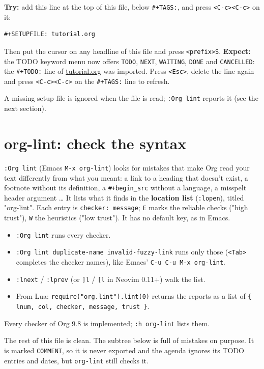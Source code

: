 \textbf{Try:} add this line at the top of this file, below \texttt{\#+TAGS:}, and press
\texttt{<C-c><C-c>} on it:
\begin{verbatim}
#+SETUPFILE: tutorial.org
\end{verbatim}
Then put the cursor on any headline of this file and press \texttt{<prefix>S}.
\textbf{Expect:} the TODO keyword menu now offers \texttt{TODO}, \texttt{NEXT}, \texttt{WAITING},
\texttt{DONE} and \texttt{CANCELLED}: the \texttt{\#+TODO:} line of \href{tutorial.org}{tutorial.org}
was imported. Press \texttt{<Esc>}, delete the line again and press
\texttt{<C-c><C-c>} on the \texttt{\#+TAGS:} line to refresh.

A missing setup file is ignored when the file is read; \texttt{:Org lint}
reports it (see the next section).
\section{org-lint: check the syntax}
\label{sec:orge7575d4}
\texttt{:Org lint} (Emacs \texttt{M-x org-lint}) looks for mistakes that make Org read
your text differently from what you meant: a link to a heading that
doesn't exist, a footnote without its definition, a \texttt{\#+begin\_src} without
a language, a misspelt header argument \ldots{} It lists what it finds in the
\textbf{location list} (\texttt{:lopen}), titled "org-lint". Each entry is
\texttt{checker: message}; \texttt{E} marks the reliable checks ("high trust"), \texttt{W} the
heuristics ("low trust"). It has no default key, as in Emacs.

\begin{itemize}
\item \texttt{:Org lint} runs every checker.
\item \texttt{:Org lint duplicate-name invalid-fuzzy-link} runs only those
(\texttt{<Tab>} completes the checker names), like Emacs' \texttt{C-u C-u M-x
  org-lint}.
\item \texttt{:lnext} / \texttt{:lprev} (or \texttt{]l} / \texttt{[l} in Neovim 0.11+) walk the list.
\item From Lua: \texttt{require("org.lint").lint(0)} returns the reports as a list
of \texttt{\{ lnum, col, checker, message, trust \}}.
\end{itemize}

Every checker of Org 9.8 is implemented; \texttt{:h org-lint} lists them.

The rest of this file is clean. The subtree below is full of mistakes on
purpose. It is marked \texttt{COMMENT}, so it is never exported and the agenda
ignores its TODO entries and dates, but \texttt{org-lint} still checks it.

